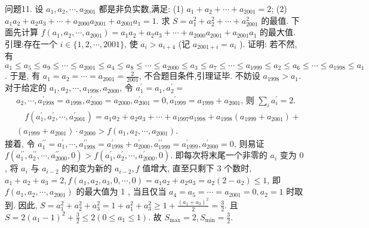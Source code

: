 问题11. 设 $a_1, a_2, \cdots, a_{2001}$ 都是非负实数,满足:
(1) $a_1+a_2+\cdots+a_{2001}=2$;
(2) $a_1 a_2+a_2 a_3+\cdots+a_{2000} a_{2001}+a_{2001} a_1=1$.
求 $S=a_1^2+a_2^2+\cdots+a_{2001}^2$ 的最值.
下面先计算 $f\left(a_1, a_2, \cdots, a_{2001}\right)=a_1 a_2+a_2 a_3+\cdots+a_{2000} a_{2001}+ a_{2001} a_1$ 的最大值.
引理:存在一个 $i \in\{1,2, \cdots, 2001\}$, 使 $a_i>a_{i+4}$ (记 $a_{2001+i}=a_i$ ).
证明: 若不然, 有 $a_1 \leqslant a_5 \leqslant a_9 \leqslant \cdots \leqslant a_{2001} \leqslant a_4 \leqslant a_8 \leqslant \cdots \leqslant a_{2000} \leqslant a_3 \leqslant a_7 \leqslant \cdots \leqslant a_{1999} \leqslant a_2 \leqslant a_6 \leqslant \cdots \leqslant a_{1998} \leqslant a_1$.
于是, 有 $a_1=a_2=\cdots=a_{2001}=\frac{2}{2001}$, 不合题目条件,引理证毕.
不妨设 $a_{1998}>a_1$. 对于给定的 $a_1, a_2, \cdots, a_{1998}, a_{2000}$, 令 $a_1^{\prime}=a_1, a_2^{\prime}=$
$$
\begin{aligned}
& a_2, \cdots, a_{1998}^{\prime}=a_{1998}, a_{2000}^{\prime}=a_{2000}, a_{2001}^{\prime}=0, a_{1999}^{\prime}=a_{1999}+a_{2001} \text {, 则 } \sum_i a_i^{\prime}=2 . \\
& \quad f\left(a_1^{\prime}, a_2^{\prime}, \cdots, a_{2001}^{\prime}\right)=a_1 a_2+a_2 a_3+\cdots+a_{1997} a_{1998}+a_{1998}\left(a_{1999}+a_{2001}\right)+ \\
& \left(a_{1999}+a_{2001}\right) \cdot a_{2000}>f\left(a_1, a_2, \cdots, a_{2001}\right) .
\end{aligned}
$$
接着, 令 $a_1^{\prime \prime}=a_1^{\prime}, \cdots, a_{1998}^{\prime \prime}=a_{1998}^{\prime}+a_{2000}^{\prime}, a_{1999}^{\prime \prime}=a_{1999}^{\prime}, a_{2000}^{\prime}=0$, 则易证 $f\left(a_1^{\prime \prime}, a_2^{\prime \prime}, \cdots, a_{2000}^{\prime \prime}, 0\right)>f\left(a_1^{\prime}, a_2^{\prime}, \cdots, a_{2000}^{\prime}, 0\right)$.
即每次将末尾一个非零的 $a_i$ 变为 0 , 将 $a_i$ 与 $a_{i-2}$ 的和变为新的 $a_{i-2}, f$ 值增大, 直至只剩下 3 个数时, $a_1+a_2+a_3=2, f\left(a_1, a_2, a_3, 0, \cdots, 0\right)= a_1 a_2+a_2 a_3=a_2\left(2-a_2\right) \leqslant 1$, 即 $f\left(a_1, a_2, \cdots, a_{2001}\right)$ 的最大值为 1 , 当且仅当 $a_4=a_5=\cdots=a_{2001}=0, a_2=1$ 时取到.
因此, $S=a_1^2+a_2^2+a_3^2=1+a_1^2+a_3^2 \geqslant 1+\frac{\left(a_1+a_3\right)^2}{2}=\frac{3}{2}$.
且 $S=2\left(a_1-1\right)^2+\frac{3}{2} \leqslant 2\left(0 \leqslant a_1 \leqslant 1\right)$. 故 $S_{\max }=2, S_{\min }=\frac{3}{2}$.



